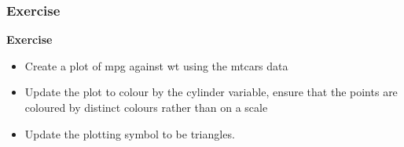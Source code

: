 \documentclass[MASTER.tex]{subfiles}
\begin{document}
\begin{frame}
\frametitle{Exercise}
\Large
\textbf{Exercise}
\begin{itemize}
\item Create a plot of mpg against wt using the mtcars
data
\item Update the plot to colour by the cylinder variable,
ensure that the points are coloured by distinct
colours rather than on a scale
\item Update the plotting symbol to be triangles.
\end{itemize}
\end{frame}
\end{document}
